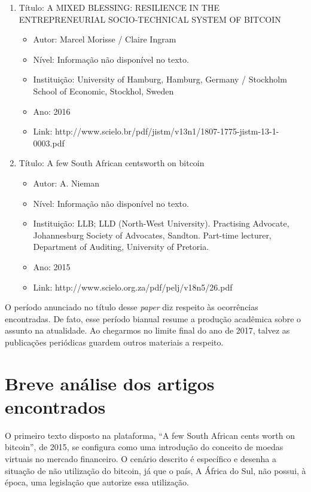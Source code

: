 \documentclass[12pt]{article}
\begin{document}
\begin{enumerate}[I]
\item Título: A MIXED BLESSING: RESILIENCE IN THE ENTREPRENEURIAL SOCIO-TECHNICAL SYSTEM OF BITCOIN
\begin{itemize}

\item Autor: 
Marcel Morisse / Claire Ingram
\item Nível: Informação não disponível no texto.
\item Instituição: University of Hamburg, Hamburg, Germany / Stockholm School of Economic, Stockhol, Sweden
\item Ano: 
2016
\item Link: 
http://www.scielo.br/pdf/jistm/v13n1/1807-1775-jistm-13-1-0003.pdf
\end{itemize}


\item Título: A few South African centsworth on bitcoin
\begin{itemize}

\item Autor: 
A. Nieman
\item Nível: Informação não disponível no texto.
\item Instituição: LLB; LLD (North-West University). Practising Advocate, Johannesburg Society of Advocates, Sandton. Part-time lecturer, Department of Auditing, University of Pretoria.
\item Ano: 
2015
\item Link: 
http://www.scielo.org.za/pdf/pelj/v18n5/26.pdf
\end{itemize}

\end{enumerate}

O período anunciado no título desse \textit{paper} diz respeito às ocorrências encontradas. De fato, esse período bianual resume a produção acadêmica sobre o assunto na atualidade. Ao chegarmos no limite final do ano de 2017, talvez as publicações periódicas guardem outros materiais a respeito.

\section{Breve análise dos artigos encontrados}

O primeiro texto disposto na plataforma, “A few South African cents worth on bitcoin”, de 2015, se configura como uma introdução do conceito de moedas virtuais no mercado financeiro. O cenário descrito é específico e desenha a situação de não utilização do bitcoin, já que o país, A África do Sul, não possui, à época, uma legislação que autorize essa utilização.
\end{document}
